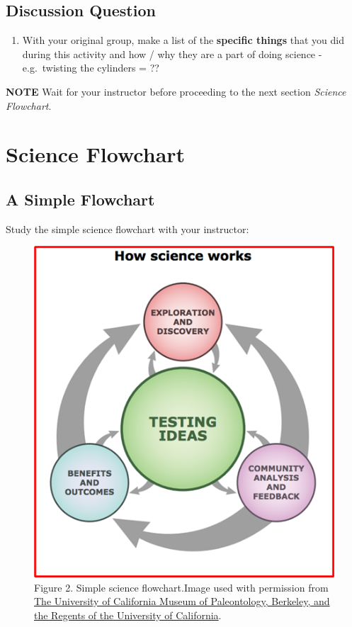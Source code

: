 \documentclass[
]{book}
\providecommand{\tightlist}{%
  \setlength{\itemsep}{0pt}\setlength{\parskip}{0pt}}
\begin{document}
\hypertarget{discussion-question}{%
\subsection*{Discussion Question}\label{discussion-question}}

\begin{enumerate}
\def\labelenumi{\arabic{enumi}.}
\tightlist
\item
  With your original group, make a list of the \textbf{specific things} that you did during this activity and how / why they are a part of doing science - e.g.~twisting the cylinders = ??
\end{enumerate}

\textbf{NOTE} Wait for your instructor before proceeding to the next section \emph{Science Flowchart}.

\hypertarget{science-flowchart}{%
\section*{Science Flowchart}\label{science-flowchart}}

\hypertarget{a-simple-flowchart}{%
\subsection*{A Simple Flowchart}\label{a-simple-flowchart}}

Study the simple science flowchart with your instructor:

\begin{figure}
\centering
\includegraphics{figures_images/Lab2a-Fig2.png}
\caption{Figure 2. Simple science flowchart.Image used with permission from \href{www.understandingscience.org}{The University of California Museum of Paleontology, Berkeley, and the Regents of the University of California}.}
\end{figure}
\end{document}
